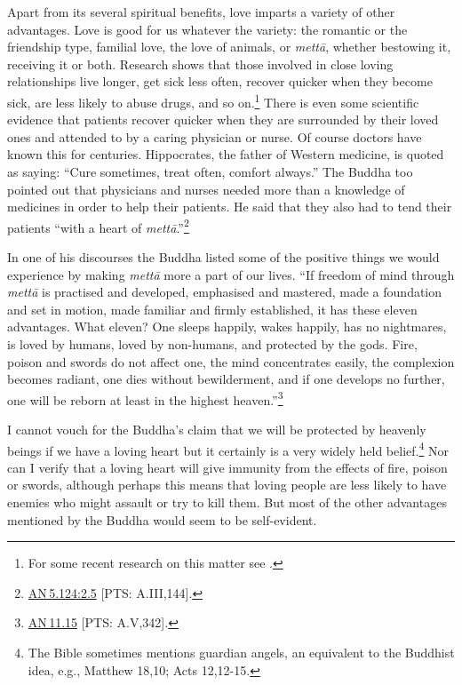 \documentclass[10pt, openright]{book}
\begin{document}
Apart from its several spiritual benefits, love imparts a variety of other advantages. Love is good for us whatever the variety: the romantic or the friendship type, familial love, the love of animals, or \textit{mettā}, whether bestowing it, receiving it or both. Research shows that those involved in close loving relationships live longer, get sick less often, recover quicker when they become sick, are less likely to abuse drugs, and so on.\footnote {For some recent research on this matter see \cite{Germer 2009}.} There is even some scientific evidence that patients recover quicker when they are surrounded by their loved ones and attended to by a caring physician or nurse. Of course doctors have known this for centuries. Hippocrates, the father of Western medicine, is quoted as saying: “Cure sometimes, treat often, comfort always.” The Buddha too pointed out that physicians and nurses needed more than a knowledge of medicines in order to help their patients. He said that they also had to tend their patients “with a heart of \textit{mettā}.”\footnote {\href{https://suttacentral.net/an5.124/en/sujato\#2.5}{AN 5.124:2.5} [PTS: A.III,144].}


In one of his discourses the Buddha listed some of the positive things we would experience by making \textit{mettā} more a part of our lives. “If freedom of mind through \textit{mettā} is practised and developed, emphasised and mastered, made a foundation and set in motion, made familiar and firmly established, it has these eleven advantages. What eleven? One sleeps happily, wakes happily, has no nightmares, is loved by humans, loved by non-humans, and protected by the gods. Fire, poison and swords do not affect one, the mind concentrates easily, the complexion becomes radiant, one dies without bewilderment, and if one develops no further, one will be reborn at least in the highest heaven.”\footnote {\href{https://suttacentral.net/an11.15/en/sujato}{AN 11.15} [PTS: A.V,342].}


I cannot vouch for the Buddha’s claim that we will be protected by heavenly beings if we have a loving heart but it certainly is a very widely held belief.\footnote {The Bible sometimes mentions guardian angels, an equivalent to the Buddhist idea, e.g., Matthew 18,10; Acts 12,12-15.} Nor can I verify that a loving heart will give immunity from the effects of fire, poison or swords, although perhaps this means that loving people are less likely to have enemies who might assault or try to kill them. But most of the other advantages mentioned by the Buddha would seem to be self-evident.
\end{document}
